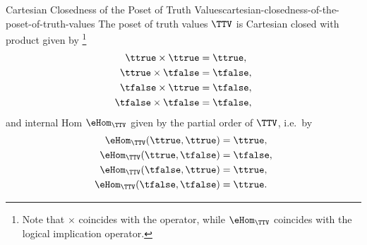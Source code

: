 \begin{proposition}{Cartesian Closedness of the Poset of Truth Values}{cartesian-closedness-of-the-poset-of-truth-values}%
    The poset of truth values $\TTV$ is Cartesian closed with product given by%
    \footnote{%
        Note that $\times$ coincides with the  operator, while $\eHom_{\TTV}$ coincides with the logical implication operator.
        \par\vspace*{-1.75\baselineskip}
    }%
    \begin{align*}
        \ttrue  \times \ttrue  &= \ttrue,\\
        \ttrue  \times \tfalse &= \tfalse,\\
        \tfalse \times \ttrue  &= \tfalse,\\
        \tfalse \times \tfalse &= \tfalse,
    \end{align*}
    and internal Hom $\eHom_{\TTV}$ given by the partial order of $\TTV$, i.e.\ by
    \begin{align*}
        \eHom_{\TTV}(\ttrue,\ttrue)   &= \ttrue,\\
        \eHom_{\TTV}(\ttrue,\tfalse)  &= \tfalse,\\
        \eHom_{\TTV}(\tfalse,\ttrue)  &= \ttrue,\\
        \eHom_{\TTV}(\tfalse,\tfalse) &= \ttrue.
    \end{align*}
\end{proposition}
